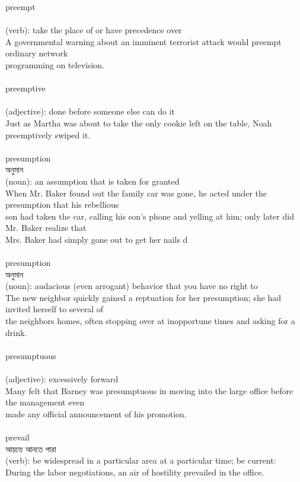 \documentclass{article}
\begin{document}
{preempt}\\
{}\\
{(verb): take the place of or have precedence over\\A governmental warning about an imminent terrorist attack would preempt ordinary network\\programming on television.\\}\\
{preemptive}\\
{}\\
{(adjective): done before someone else can do it\\Just as Martha was about to take the only cookie left on the table, Noah preemptively swiped it.\\}\\
{presumption}\\
{অনুমান}\\
{(noun): an assumption that is taken for granted\\When Mr. Baker found out the family car was gone, he acted under the presumption that his rebellious\\son had taken the car, calling his son's phone and yelling at him; only later did Mr. Baker realize that\\Mrs. Baker had simply gone out to get her nails d\\}\\
{presumption}\\
{অনুমান}\\
{(noun): audacious (even arrogant) behavior that you have no right to\\The new neighbor quickly gained a reptuation for her presumption; she had invited herself to several of\\the neighbors homes, often stopping over at inopportune times and asking for a drink.\\}\\
{presumptuous}\\
{}\\
{(adjective): excessively forward\\Many felt that Barney was presumptuous in moving into the large office before the management even\\made any official announcement of his promotion.\\}\\
{prevail}\\
{আয়ত্তে আনতে পারা}\\
{(verb): be widespread in a particular area at a particular time; be current:\\During the labor negotiations, an air of hostility prevailed in the office.\\}\\
\end{document}
